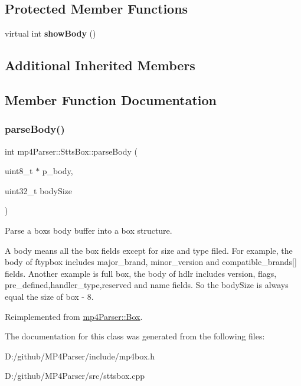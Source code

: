 \subsection*{Protected Member Functions}
\begin{DoxyCompactItemize}
\item 
\mbox{\label{classmp4_parser_1_1_stts_box_aaa5036a49713e949719ffa8f42f9295a}} 
virtual int {\bfseries show\+Body} ()
\end{DoxyCompactItemize}
\subsection*{Additional Inherited Members}


\subsection{Member Function Documentation}
\mbox{\label{classmp4_parser_1_1_stts_box_a227b3d37201475d3c3deef99fda2323a}} 
\subsubsection{\texorpdfstring{parseBody()}{parseBody()}}
{\footnotesize\ttfamily int mp4\+Parser\+::\+Stts\+Box\+::parse\+Body (\begin{DoxyParamCaption}\item[{uint8\+\_\+t $\ast$}]{p\+\_\+body,  }\item[{uint32\+\_\+t}]{body\+Size }\end{DoxyParamCaption})\hspace{0.3cm}{\ttfamily [virtual]}}



Parse a box\textquotesingle{}s body buffer into a box structure. 

A body means all the box fields except for size and type filed. For example, the body of ftypbox includes major\+\_\+brand, minor\+\_\+version and compatible\+\_\+brands\mbox{[}\mbox{]} fields. Another example is full box, the body of hdlr includes version, flags, pre\+\_\+defined,handler\+\_\+type,reserved and name fields. So the body\+Size is always equal the size of box -\/ 8. 

Reimplemented from \mbox{\hyperlink{classmp4_parser_1_1_box_a3dd0c084ac65bc77b69ac5ecaf796cb2}{mp4\+Parser\+::\+Box}}.



The documentation for this class was generated from the following files\+:\begin{DoxyCompactItemize}
\item 
D\+:/github/\+M\+P4\+Parser/include/mp4box.\+h\item 
D\+:/github/\+M\+P4\+Parser/src/sttsbox.\+cpp\end{DoxyCompactItemize}
